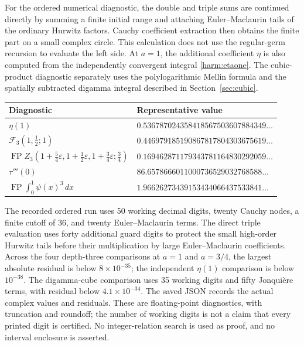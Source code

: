 \documentclass[11pt,letterpaper]{article}
\numberwithin{equation}{section}
\theoremstyle{definition}
\theoremstyle{remark}
\DeclareMathOperator{\FP}{FP}
\newcommand{\eps}{\varepsilon}
\begin{document}
For the ordered numerical diagnostic, the double and triple sums are
continued directly by summing a finite initial range and attaching
Euler--Maclaurin tails of the ordinary Hurwitz factors. Cauchy
coefficient extraction then obtains the finite part on a small
complex circle. This calculation does not use the regular-germ
recursion to evaluate the left side. At $a=1$, the additional
coefficient $\eta$ is also computed from the independently convergent
integral \eqref{harm:etaone}. The cubic-product diagnostic separately
uses the polylogarithmic Mellin formula and the spatially subtracted
digamma integral described in Section~\ref{sec:cubic}.

\begin{center}
\small
\begin{tabular}{p{}p{}}
\toprule
Diagnostic & Representative value\\
\midrule
$\eta(1)$ & $0.536787024358418567503607884349\ldots$\\[3pt]
$\mathcal F_3(1,\tfrac12;1)$ &
 $0.446979185190867817804303675619\ldots$\\[3pt]
$\FP Z_3(1+\tfrac54\eps,1+\tfrac12\eps,
1+\tfrac34\eps;\tfrac34)$ &
 $0.169462871179343781164830292059\ldots$\\[3pt]
$\tau'''(0)$ & $86.6578666011000736529032768588\ldots$\\[3pt]
$\FP\int_0^1\psi(x)^3\,dx$ &
 $1.96626273439153434066437533841\ldots$\\
\bottomrule
\end{tabular}
\end{center}

The recorded ordered run uses 50 working decimal digits, twenty
Cauchy nodes, a finite cutoff of 36, and twenty Euler--Maclaurin terms.
The direct triple evaluation uses forty additional guard digits to
protect the small high-order Hurwitz tails before their multiplication
by large Euler--Maclaurin coefficients.
Across the four depth-three comparisons at $a=1$ and $a=3/4$, the
largest absolute residual is below $8\times10^{-35}$; the independent
$\eta(1)$ comparison is below $10^{-38}$. The digamma-cube comparison
uses 35 working digits and fifty Jonqui\`ere terms, with residual
below $4.1\times10^{-34}$. The saved JSON records the actual complex
values and residuals. These are floating-point diagnostics, with
truncation and roundoff; the number of working digits is not a claim
that every printed digit is certified. No integer-relation search is
used as proof, and no interval enclosure is asserted.
\end{document}
